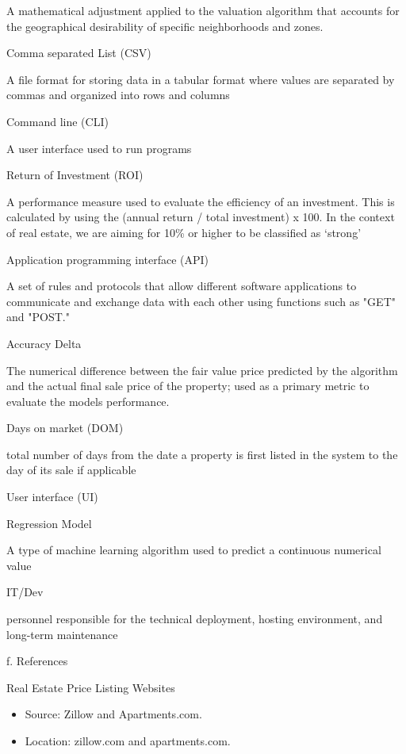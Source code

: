 \documentclass[
]{article}
\begin{document}
A mathematical adjustment applied to the valuation algorithm that
accounts for the geographical desirability of specific neighborhoods and
zones.

Comma separated List (CSV)

A file format for storing data in a tabular format where values are
separated by commas and organized into rows and columns

Command line (CLI)

A user interface used to run programs

Return of Investment (ROI)

A performance measure used to evaluate the efficiency of an investment.
This is calculated by using the (annual return / total investment) x
100. In the context of real estate, we are aiming for 10\% or higher to
be classified as `strong'

Application programming interface (API)

A set of rules and protocols that allow different software applications
to communicate and exchange data with each other using functions such as
"GET" and "POST."

Accuracy Delta

The numerical difference between the fair value price predicted by the
algorithm and the actual final sale price of the property; used as a
primary metric to evaluate the model\textquotesingle s performance.

Days on market (DOM)

total number of days from the date a property is first listed in the
system to the day of its sale if applicable

User interface (UI)

Regression Model

A type of machine learning algorithm used to predict a continuous
numerical value

IT/Dev

personnel responsible for the technical deployment, hosting environment,
and long-term maintenance

f. References

Real Estate Price Listing Websites

\begin{itemize}
\item
  Source: Zillow and Apartments.com.
\end{itemize}

\begin{itemize}
\item
  Location: zillow.com and apartments.com.
\end{itemize}
\end{document}
